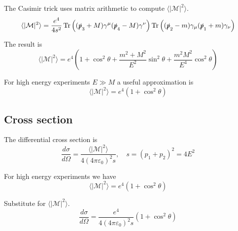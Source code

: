 \documentclass[12pt]{article}
\begin{document}
The Casimir trick uses matrix arithmetic to compute $\langle|\mathcal{M}|^2\rangle$.
\begin{equation*}
\langle|\mathcal{M}|^2\rangle
=\frac{e^4}{4s^2}
\mathop{\rm Tr}\left((\slashed{p}_3+M)\gamma^\mu(\slashed{p}_4-M)\gamma^\nu\right)
\mathop{\rm Tr}\left((\slashed{p}_2-m)\gamma_\mu(\slashed{p}_1+m)\gamma_\nu\right)
\end{equation*}

\iffalse

Another way to compute $\langle|\mathcal{M}|^2\rangle$ is
\begin{equation*}
\langle|\mathcal{M}|^2\rangle
=\frac{e^4}{4s^2}
\left(-8 s^2 + 16 t^2 - 16 s u + (64 s + 32 u) \left(m^2 + M^2\right) - 48 \left(m^2 + M^2\right)^2\right)
\end{equation*}
where
\begin{align*}
s&=(p_1+p_2)^2
\\
t&=(p_1-p_3)^2
\\
u&=(p_1-p_4)^2
\end{align*}

\fi

The result is
\begin{equation*}
\langle|\mathcal{M}|^2\rangle
=e^4\left(1+\cos^2\theta+\frac{m^2+M^2}{E^2}\sin^2\theta+\frac{m^2M^2}{E^4}\cos^2\theta\right)
\end{equation*}

For high energy experiments $E\gg M$ a useful approximation is
\begin{equation*}
\langle|\mathcal{M}|^2\rangle=e^4\left(1+\cos^2\theta\right)
\end{equation*}

\subsection*{Cross section}
The differential cross section is
\begin{equation*}
\frac{d\sigma}{d\Omega}
=\frac{\langle|\mathcal{M}|^2\rangle}{4(4\pi\varepsilon_0)^2s},
\quad s=(p_1+p_2)^2=4E^2
\end{equation*}

For high energy experiments we have
\begin{equation*}
\langle|\mathcal{M}|^2\rangle=e^4\left(1+\cos^2\theta\right)
\end{equation*}

Substitute for $\langle|\mathcal{M}|^2\rangle$.
\begin{equation*}
\frac{d\sigma}{d\Omega}=\frac{e^4}{4(4\pi\varepsilon_0)^2s}\left(1+\cos^2\theta\right)
\end{equation*}
\end{document}
